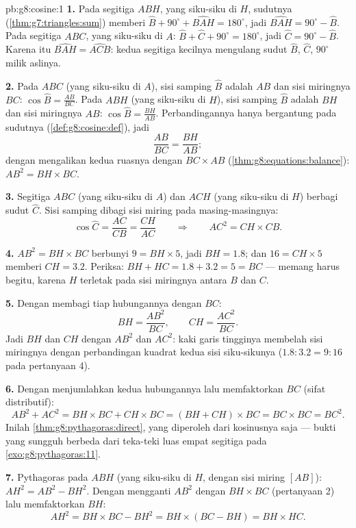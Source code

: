 \begin{solution}{pb:g8:cosine:1}
\textbf{1.} Pada segitiga $ABH$, yang siku-siku di $H$, 
sudutnya (\cref{thm:g7:triangles:sum}) memberi
$\widehat B + 90^\circ + \widehat{BAH} = 180^\circ$, jadi
$\widehat{BAH} = 90^\circ - \widehat B$. Pada segitiga $ABC$,
yang siku-siku di $A$:
$\widehat B + \widehat C + 90^\circ = 180^\circ$, jadi
$\widehat C = 90^\circ - \widehat B$. Karena itu
$\widehat{BAH} = \widehat{ACB}$: kedua segitiga kecilnya mengulang
sudut $\widehat B$, $\widehat C$, $90^\circ$ milik aslinya.

\textbf{2.} Pada $ABC$ (yang siku-siku di $A$), sisi samping
$\widehat B$ adalah $AB$ dan sisi miringnya $BC$:
$\cos\widehat B = \frac{AB}{BC}$. Pada $ABH$ (yang siku-siku di $H$),
sisi samping $\widehat B$ adalah $BH$ dan sisi miringnya
$AB$: $\cos\widehat B = \frac{BH}{AB}$. Perbandingannya hanya
bergantung pada sudutnya (\cref{def:g8:cosine:def}), jadi
\[
\frac{AB}{BC} = \frac{BH}{AB} ;
\]
dengan mengalikan kedua ruasnya dengan $BC \times AB$
(\cref{thm:g8:equations:balance}):
$AB^2 = BH \times BC$.

\textbf{3.} Segitiga $ABC$ (yang siku-siku di $A$) dan $ACH$
(yang siku-siku di $H$) berbagi sudut $\widehat C$. Sisi samping
dibagi sisi miring pada masing-masingnya:
\[
\cos\widehat C = \frac{AC}{CB} = \frac{CH}{AC}
\qquad\Longrightarrow\qquad
AC^2 = CH \times CB .
\]

\textbf{4.} $AB^2 = BH \times BC$ berbunyi $9 = BH \times 5$, jadi
$BH = 1.8$; dan $16 = CH \times 5$ memberi $CH = 3.2$. Periksa:
$BH + HC = 1.8 + 3.2 = 5 = BC$ --- memang harus begitu, karena $H$
terletak pada sisi miringnya antara $B$ dan $C$.

\textbf{5.} Dengan membagi tiap hubungannya dengan $BC$:
\[
BH = \frac{AB^2}{BC},
\qquad
CH = \frac{AC^2}{BC} .
\]
Jadi $BH$ dan $CH$  dengan $AB^2$ dan $AC^2$: kaki
garis tingginya membelah sisi miringnya dengan perbandingan kuadrat
kedua sisi siku-sikunya ($1.8 : 3.2 = 9 : 16$ pada pertanyaan 4).

\textbf{6.} Dengan menjumlahkan kedua hubungannya lalu memfaktorkan
$BC$ (sifat distributif):
\[
AB^2 + AC^2 = BH \times BC + CH \times BC
= (BH + CH) \times BC = BC \times BC = BC^2 .
\]
Inilah \cref{thm:g8:pythagoras:direct}, yang diperoleh dari kosinusnya
saja --- bukti yang sungguh berbeda dari teka-teki luas empat segitiga
pada \cref{exo:g8:pythagoras:11}.

\textbf{7.} Pythagoras pada $ABH$ (yang siku-siku di $H$, dengan sisi
miring $[AB]$): $AH^2 = AB^2 - BH^2$. Dengan mengganti $AB^2$ dengan
$BH \times BC$ (pertanyaan 2) lalu memfaktorkan $BH$:
\[
AH^2 = BH \times BC - BH^2
= BH \times (BC - BH)
= BH \times HC .
\]


\end{solution}
